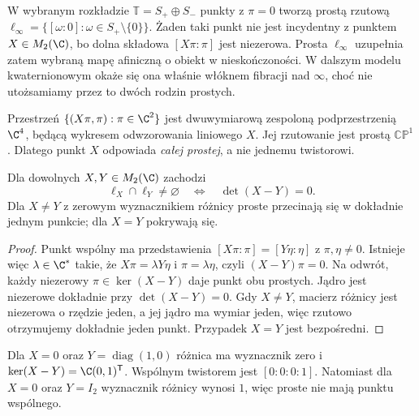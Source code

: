 W wybranym rozkładzie $\mathbb T=S_+\oplus S_-$ punkty
z $\pi=0$ tworzą prostą rzutową
$\ell_\infty=\{[\omega:0]:\omega\in S_+\setminus\{0\}\}$.
Żaden taki punkt nie jest incydentny z punktem
$X\in M_2(\C)$, bo dolna składowa
$[X\pi:\pi]$ jest niezerowa. Prosta $\ell_\infty$
uzupełnia zatem wybraną mapę afiniczną o obiekt
w nieskończoności. W dalszym modelu kwaternionowym
okaże się ona właśnie włóknem fibracji nad $\infty$,
choć nie utożsamiamy przez to dwóch rodzin prostych.

Przestrzeń $\{(X\pi,\pi):\pi\in\C^2\}$ jest
dwuwymiarową zespoloną podprzestrzenią $\C^4$,
będącą wykresem odwzorowania liniowego $X$.
Jej rzutowanie jest prostą $\mathbb{CP}^1$.
Dlatego punkt $X$ odpowiada \emph{całej prostej},
a nie jednemu twistorowi.

\begin{twierdzenie}
\label{thm:lin32-przeciecie}
Dla dowolnych $X,Y\in M_2(\C)$ zachodzi
\[
 \ell_X\cap\ell_Y\ne\varnothing
 \quad\Longleftrightarrow\quad\det(X-Y)=0.
\]
Dla $X\ne Y$ z zerowym wyznacznikiem różnicy
proste przecinają się w dokładnie jednym punkcie;
dla $X=Y$ pokrywają się.
\end{twierdzenie}
\begin{proof}
Punkt wspólny ma przedstawienia
$[X\pi:\pi]=[Y\eta:\eta]$ z $\pi,\eta\ne0$.
Istnieje więc $\lambda\in\C^\ast$ takie, że
$X\pi=\lambda Y\eta$ i $\pi=\lambda\eta$,
czyli $(X-Y)\pi=0$.
Na odwrót, każdy niezerowy $\pi\in\ker(X-Y)$
daje punkt obu prostych.
Jądro jest niezerowe dokładnie przy
$\det(X-Y)=0$. Gdy $X\ne Y$, macierz różnicy
jest niezerowa o rzędzie jeden, a jej jądro
ma wymiar jeden, więc rzutowo otrzymujemy
dokładnie jeden punkt. Przypadek $X=Y$
jest bezpośredni.
\end{proof}

\begin{przyklad}
\label{prz:lin32-przeciecie}
Dla $X=0$ oraz $Y=\operatorname{diag}(1,0)$
różnica ma wyznacznik zero i
$\ker(X-Y)=\C(0,1)^{\mathsf T}$.
Wspólnym twistorem jest $[0:0:0:1]$.
Natomiast dla $X=0$ oraz $Y=I_2$
wyznacznik różnicy wynosi $1$,
więc proste nie mają punktu wspólnego.
\end{przyklad}

